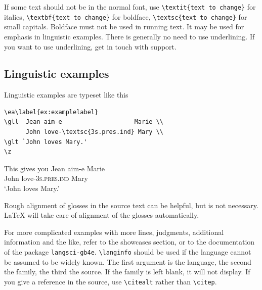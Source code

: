 If some text should not be in the normal font, use
\verb+\textit{text to change}+ for italics,
\verb+\textbf{text to change}+ for boldface,
\verb+\textsc{text to change}+ for small capitals. Boldface must not be used in running text. It may be used for emphasis in linguistic examples.
There is generally no need to use underlining. If you want to use underlining, get in touch with support.

\subsection{Linguistic examples}
Linguistic examples are typeset like this

\begin{verbatim}
\ea\label{ex:examplelabel}
\gll  Jean aim-e                    Marie \\
      John love-\textsc{3s.pres.ind} Mary \\
\glt `John loves Mary.'
\z
\end{verbatim}

\newcommand{\sg}{\textsc{sg}}
\newcommand{\prs}{\textsc{prs}}
\newcommand{\ind}{\textsc{ind}}
This gives you
\ea\label{ex:examplelabel}
\gll  Jean aim-e Marie \\
      John love-\textsc{3s.pres.ind}  Mary \\
\glt `John loves Mary.'
\z

Rough alignment of glosses in the source text can be helpful, but is not necessary. \LaTeX\xspace will take care of alignment of the glosses automatically.
%

For more complicated examples with more lines, judgments, additional information and the like, refer to the showcases section, or to the documentation of the package \verb+langsci-gb4e+.
\verb+\langinfo+ should be used if the language cannot be assumed to be widely known. The first argument is the language, the second the family, the third the source. If the family is left blank, it will not display. If you give a reference in the source, use \verb+\citealt+ rather than \verb+\citep+.

